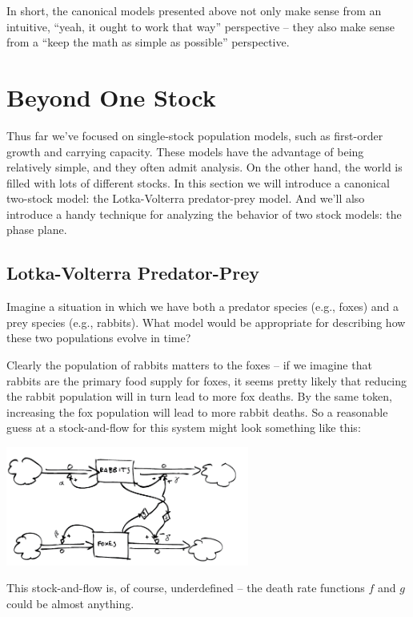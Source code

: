 In short, the canonical models presented above not only make sense from an intuitive, ``yeah, it ought to work that way'' perspective -- they also make sense from a ``keep the math as simple as possible'' perspective.

\section*{Beyond One Stock}

Thus far we've focused on single-stock population models, such as first-order growth and carrying capacity.  These models have the advantage of being relatively simple, and they often admit analysis.  On the other hand, the world is filled with lots of different stocks.  In this section we will introduce a canonical two-stock model:  the Lotka-Volterra predator-prey model.  And we'll also introduce a handy technique for analyzing the behavior of two stock models:  the phase plane.

\subsection*{Lotka-Volterra Predator-Prey}

Imagine a situation in which we have both a predator  species (e.g., foxes) and a prey species (e.g., rabbits).  What model would be appropriate for describing how these two populations evolve in time?

Clearly the population of rabbits matters to the foxes -- if we imagine that rabbits are the primary food supply for foxes, it seems pretty likely that reducing the rabbit population will in turn lead to more fox deaths.  By the same token, increasing the fox population will lead to more rabbit deaths.  So a reasonable guess at a stock-and-flow for this system might look something like this:

\centerline{\includegraphics[width=8cm]{figs/RabbitFoxStockAndFlow.png}}

This stock-and-flow is, of course, underdefined -- the death rate functions $f$ and $g$ could be almost anything.

